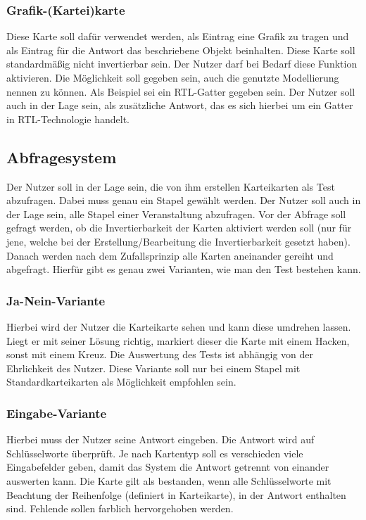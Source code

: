 \documentclass[
a4paper,
twoside,
DIV=12,
BCOR=8mm,
headlineinclude=true,
footinclude=false,
numbers=noenddot,
headheight=40pt, 11pt]{scrartcl}
\begin{document}
\subsubsection{Grafik-(Kartei)karte}
Diese Karte soll dafür verwendet werden, als Eintrag eine Grafik zu tragen und als Eintrag für die Antwort das beschriebene Objekt beinhalten. Diese Karte soll standardmäßig nicht invertierbar sein. Der Nutzer darf bei Bedarf diese Funktion aktivieren. Die Möglichkeit soll gegeben sein, auch die genutzte Modellierung nennen zu können. Als Beispiel sei ein RTL-Gatter gegeben sein. Der Nutzer soll auch in der Lage sein, als zusätzliche Antwort, das es sich hierbei um ein Gatter in RTL-Technologie handelt. 
\subsection{Abfragesystem}
Der Nutzer soll in der Lage sein, die von ihm erstellen Karteikarten als Test abzufragen. Dabei muss genau ein Stapel gewählt werden. Der Nutzer soll auch in der Lage sein, alle Stapel einer Veranstaltung abzufragen. Vor der Abfrage soll gefragt werden, ob die Invertierbarkeit der Karten aktiviert werden soll (nur für jene, welche bei der Erstellung/Bearbeitung die Invertierbarkeit gesetzt haben). Danach werden nach dem Zufallsprinzip alle Karten aneinander gereiht und abgefragt. Hierfür gibt es genau zwei Varianten, wie man den Test bestehen kann.
\subsubsection{Ja-Nein-Variante}
Hierbei wird der Nutzer die Karteikarte sehen und kann diese umdrehen lassen. Liegt er mit seiner Lösung richtig, markiert dieser die Karte mit einem Hacken, sonst mit einem Kreuz. Die Auswertung des Tests ist abhängig von der Ehrlichkeit des Nutzer. Diese Variante soll nur bei einem Stapel mit Standardkarteikarten als Möglichkeit empfohlen sein.
\subsubsection{Eingabe-Variante}
Hierbei muss der Nutzer seine Antwort eingeben. Die Antwort wird auf Schlüsselworte überprüft. Je nach Kartentyp soll es verschieden viele Eingabefelder geben, damit das System die Antwort getrennt von einander auswerten kann. Die Karte gilt als bestanden, wenn alle Schlüsselworte mit Beachtung der Reihenfolge (definiert in Karteikarte), in der Antwort enthalten sind. Fehlende sollen farblich hervorgehoben werden.
\end{document}
